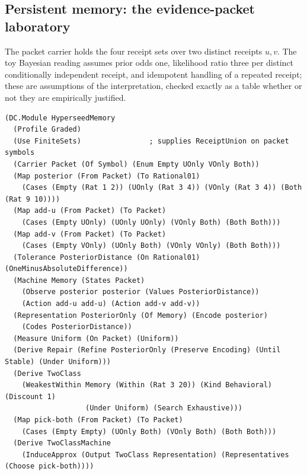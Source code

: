\documentclass[11pt]{article}
\theoremstyle{definition}
\theoremstyle{plain}
\begin{document}
\subsection{Persistent memory: the evidence-packet laboratory}\label{sec:memory}

The packet carrier holds the four receipt sets over two distinct receipts $u,v$. The toy Bayesian
reading assumes prior odds one, likelihood ratio three per distinct conditionally independent
receipt, and idempotent handling of a repeated receipt; these are assumptions of the
interpretation, checked exactly as a table whether or not they are empirically justified.

\begin{lstlisting}[basicstyle=\ttfamily\footnotesize,title={\scriptsize\ttfamily fixtures/receipt\_packets.metta}]
(DC.Module HyperseedMemory
  (Profile Graded)
  (Use FiniteSets)                ; supplies ReceiptUnion on packet symbols
  (Carrier Packet (Of Symbol) (Enum Empty UOnly VOnly Both))
  (Map posterior (From Packet) (To Rational01)
    (Cases (Empty (Rat 1 2)) (UOnly (Rat 3 4)) (VOnly (Rat 3 4)) (Both (Rat 9 10))))
  (Map add-u (From Packet) (To Packet)
    (Cases (Empty UOnly) (UOnly UOnly) (VOnly Both) (Both Both)))
  (Map add-v (From Packet) (To Packet)
    (Cases (Empty VOnly) (UOnly Both) (VOnly VOnly) (Both Both)))
  (Tolerance PosteriorDistance (On Rational01) (OneMinusAbsoluteDifference))
  (Machine Memory (States Packet)
    (Observe posterior posterior (Values PosteriorDistance))
    (Action add-u add-u) (Action add-v add-v))
  (Representation PosteriorOnly (Of Memory) (Encode posterior)
    (Codes PosteriorDistance))
  (Measure Uniform (On Packet) (Uniform))
  (Derive Repair (Refine PosteriorOnly (Preserve Encoding) (Until Stable) (Under Uniform)))
  (Derive TwoClass
    (WeakestWithin Memory (Within (Rat 3 20)) (Kind Behavioral) (Discount 1)
                   (Under Uniform) (Search Exhaustive)))
  (Map pick-both (From Packet) (To Packet)
    (Cases (Empty Empty) (UOnly Both) (VOnly Both) (Both Both)))
  (Derive TwoClassMachine
    (InduceApprox (Output TwoClass Representation) (Representatives (Choose pick-both))))
\end{lstlisting}
\end{document}
